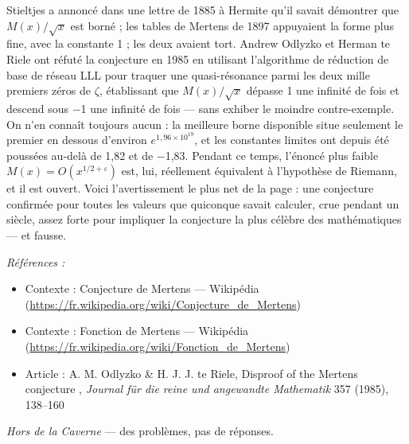 \documentclass[11pt]{article}
\newenvironment{refs}{\par\small\noindent\emph{Références :}\begin{itemize}\setlength\itemsep{0pt}}{\end{itemize}\normalsize}
\begin{document}
\noindent Stieltjes a annoncé dans une lettre de 1885 à Hermite qu'il savait
démontrer que $ M(x)/\sqrt{x} $ est borné ; les tables de Mertens de 1897 appuyaient la
forme plus fine, avec la constante 1 ; les deux avaient tort. Andrew Odlyzko et Herman te
Riele ont réfuté la conjecture en 1985 en utilisant l'algorithme de réduction de base de
réseau LLL pour traquer une quasi-résonance parmi les deux mille premiers zéros de $\zeta$,
établissant que $ M(x)/\sqrt{x} $ dépasse 1 une infinité de fois et descend sous $-$1 une
infinité de fois --- sans exhiber le moindre contre-exemple. On n'en connaît toujours aucun :
la meilleure borne disponible situe seulement le premier en dessous d'environ
$ e^{1{,}96 \times 10^{19}} $, et les constantes limites ont depuis été poussées au-delà de
1,82 et de $-$1,83. Pendant ce temps, l'énoncé plus faible
$ M(x) = O(x^{1/2 + \varepsilon}) $ est, lui, réellement équivalent à l'hypothèse de
Riemann, et il est ouvert. Voici l'avertissement le plus net de la page : une conjecture
confirmée pour toutes les valeurs que quiconque savait calculer, crue pendant un siècle,
assez forte pour impliquer la conjecture la plus célèbre des mathématiques --- et
fausse.

\begin{refs}
\item Contexte : Conjecture de Mertens --- Wikipédia (\url{https://fr.wikipedia.org/wiki/Conjecture_de_Mertens})
\item Contexte : Fonction de Mertens --- Wikipédia (\url{https://fr.wikipedia.org/wiki/Fonction_de_Mertens})
\item Article : A. M. Odlyzko \& H. J. J. te Riele, \og{} Disproof of the Mertens conjecture \fg{}, \textit{Journal für die reine und angewandte Mathematik} 357 (1985), 138--160
\end{refs}

\bigskip


\vfill
\noindent\emph{Hors de la Caverne} --- des probl\`emes, pas de r\'eponses.
\end{document}
